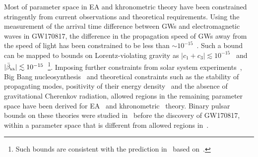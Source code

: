 \documentclass[prd,twocolumn,nofootinbib]{revtex4-1}
\newcommand{\KG}{{\mbox{\tiny kh}}}
\begin{document}
Most of parameter space in EA and khronometric theory have been constrained stringently from current observations and theoretical requirements. Using the measurement of the arrival time difference between GWs and electromagnetic waves in GW170817, the difference in the propagation speed of GWs away from the speed of light has been constrained to be less than $\sim 10^{-15}$~\cite{TheLIGOScientific:2017qsa,Monitor:2017mdv}. Such a bound can be mapped to bounds on Lorentz-violating gravity as $|c_1 + c_3| \lesssim 10^{-15}$~\cite{Oost:2018tcv} and $|\bar{\beta}_{\KG} | \lesssim10^{-15}$~\cite{Gumrukcuoglu:2017ijh}\footnote{Such bounds are consistent with the prediction in~\cite{Hansen:2014ewa} based on~\cite{Nishizawa:2014zna}.}. Imposing further constraints from solar system experiments~\cite{Bailey:2006fd,Foster:2005dk,Will:2005va}, Big Bang nucleosynthesis~\cite{Audren:2013dwa} and theoretical constraints such as the stability of propagating modes, positivity of their energy density~\cite{Eling:2005zq} and the absence of gravitational Cherenkov radiation\cite{Elliott:2005va},  allowed regions in the remaining parameter space have been derived for EA~\cite{Oost:2018tcv} and khronometric~\cite{Gumrukcuoglu:2017ijh} theory. Binary pulsar bounds on these theories were studied in~\cite{Yagi:2013ava,Yagi:2013qpa} before the discovery of GW170817, within a parameter space that is different from allowed regions in~\cite{Oost:2018tcv,Gumrukcuoglu:2017ijh}.

% 
 
\end{document}
